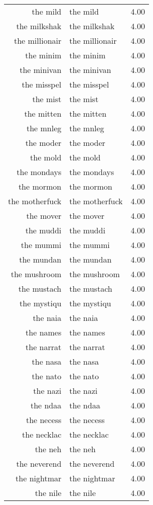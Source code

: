 \begin{table}[ht]
\begin{tabular}{rlr}
  the mild & the mild & 4.00 \\ 
  the milkshak & the milkshak & 4.00 \\ 
  the millionair & the millionair & 4.00 \\ 
  the minim & the minim & 4.00 \\ 
  the minivan & the minivan & 4.00 \\ 
  the misspel & the misspel & 4.00 \\ 
  the mist & the mist & 4.00 \\ 
  the mitten & the mitten & 4.00 \\ 
  the mnleg & the mnleg & 4.00 \\ 
  the moder & the moder & 4.00 \\ 
  the mold & the mold & 4.00 \\ 
  the mondays & the mondays & 4.00 \\ 
  the mormon & the mormon & 4.00 \\ 
  the motherfuck & the motherfuck & 4.00 \\ 
  the mover & the mover & 4.00 \\ 
  the muddi & the muddi & 4.00 \\ 
  the mummi & the mummi & 4.00 \\ 
  the mundan & the mundan & 4.00 \\ 
  the mushroom & the mushroom & 4.00 \\ 
  the mustach & the mustach & 4.00 \\ 
  the mystiqu & the mystiqu & 4.00 \\ 
  the naia & the naia & 4.00 \\ 
  the names & the names & 4.00 \\ 
  the narrat & the narrat & 4.00 \\ 
  the nasa & the nasa & 4.00 \\ 
  the nato & the nato & 4.00 \\ 
  the nazi & the nazi & 4.00 \\ 
  the ndaa & the ndaa & 4.00 \\ 
  the necess & the necess & 4.00 \\ 
  the necklac & the necklac & 4.00 \\ 
  the neh & the neh & 4.00 \\ 
  the neverend & the neverend & 4.00 \\ 
  the nightmar & the nightmar & 4.00 \\ 
  the nile & the nile & 4.00 \\ 

\end{tabular}
\end{table}
